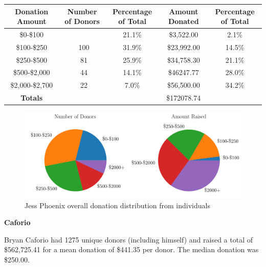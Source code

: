 \documentclass[10pt]{article}
\begin{document}
\begin{table}[ht]
\begin{tabularx}{\textwidth}{c | c c | c c}
 \bf{Donation Amount} & \bf{Number of Donors} & \bf{Percentage of Total} & \bf{Amount Donated} & \bf{Percentage of Total} \\ \hline
\enspace \enspace \enspace \$0-\$100 &\quad \quad \quad 66 & 21.1\% &\quad \quad  \$3,522.00 & 2.1\%\\ \hline
\enspace \enspace \enspace \$100-\$250 &\quad \quad \quad \ 100 & 31.9\% &\quad \quad \$23,992.00 & 14.5\% \\ \hline
\enspace \enspace \enspace \$250-\$500 &\quad \quad \quad \ 81 & 25.9\% &\quad \quad\$34,758.30 & 21.1\%\\ \hline
\enspace \enspace \enspace \$500-\$2,000 &\quad \quad \quad \ 44 & 14.1\% &\quad \quad \$46247.77 & 28.0\%\\ \hline
\enspace \enspace \enspace \$2,000-\$2,700 &\quad \quad \quad \ 22 & 7.0\% &\quad \quad \$56,500.00 & 34.2\% \\ \hline
\bf{Totals} & \quad \quad \quad 317 & & \quad \quad \$172078.74 &\\  
\end{tabularx}
\end{table}
\begin{figure}[ht]
\includegraphics[width=0.8\linewidth, center]{Phoenix_Totals.pdf}
\caption{Jess Phoenix overall donation distribution from individuals}
\end{figure}

{\Large \bf{Caforio}}

Bryan Caforio had 1275 unique donors (including himself) and raised a total of \$562,725.41 for a mean donation of \$441.35 per donor. The median donation was \$250.00. 
\end{document}
